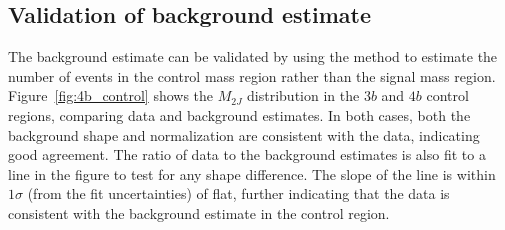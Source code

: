 \subsection{Validation of background estimate}

The background estimate can be validated by using the method to estimate the number of events in the control mass region rather than the signal mass region. Figure~\ref{fig:4b_control} shows the $M_{2J}$ distribution in the $3b$ and $4b$ control regions, comparing data and background estimates. In both cases, both the background shape and normalization are consistent with the data, indicating good agreement. The ratio of data to the background estimates is also fit to a line in the figure to test for any shape difference. The slope of the line is within $1\sigma$ (from the fit uncertainties) of flat, further indicating that the data is consistent with the background estimate in the control region. 

